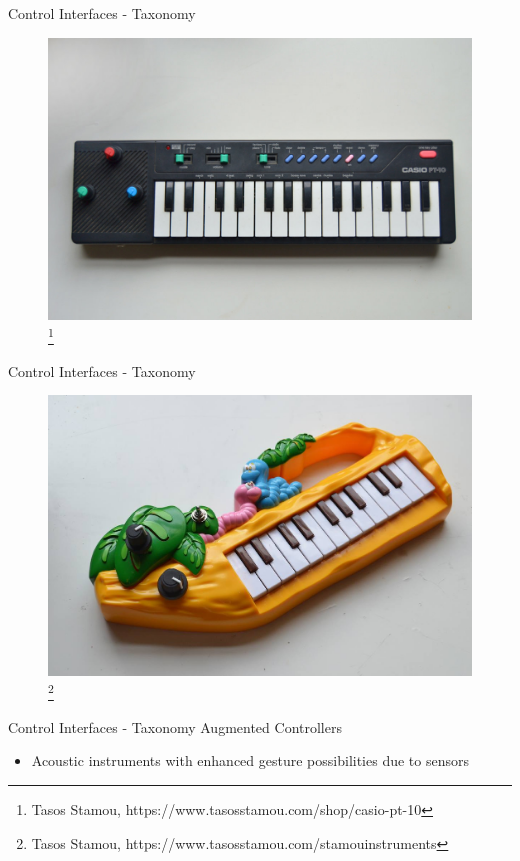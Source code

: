 \documentclass{beamer}
\newcommand\blfootnote[1]{%
  \begingroup
  \renewcommand\thefootnote{}\footnote{#1}%
  \addtocounter{footnote}{-1}%
  \endgroup
}
\begin{document}
\begin{frame}{Control Interfaces - Taxonomy}
    \begin{figure}[h]
        \includegraphics[width=\textwidth]{casiopt10.jpg}\blfootnote{Tasos Stamou,  https://www.tasosstamou.com/shop/casio-pt-10}
    \end{figure}
\end{frame}

\begin{frame}{Control Interfaces - Taxonomy}
    \begin{figure}[h]
        \includegraphics[width=\textwidth]{pianoturtle.jpg}\blfootnote{Tasos Stamou,  https://www.tasosstamou.com/stamouinstruments}
    \end{figure}
\end{frame}

\begin{frame}{Control Interfaces - Taxonomy}
   Augmented Controllers\\
   \vspace{5mm}
   \begin{itemize}
        \item Acoustic instruments with enhanced gesture possibilities due to sensors 
    \end{itemize}
\end{frame}
\end{document}
